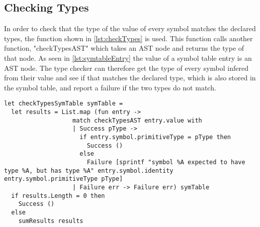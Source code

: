 \subsection{Checking Types}
In order to check that the type of the value of every symbol matches the declared types, the function shown in \cref{lst:checkTypes} is used. This function calls another function, "checkTypesAST" which takes an AST node and returns the type of that node. As seen in \cref{lst:symtableEntry} the value of a symbol table entry is an AST node. The type checker can therefore get the type of every symbol infered from their value and see if that matches the declared type, which is also stored in the symbol table, and report a failure if the two types do not match.

\begin{lstlisting}[style = fsharp, label = lst:checkTypes, caption = {The main function responsible for checking types.}]
let checkTypesSymTable symTable =
  let results = List.map (fun entry -> 
                   match checkTypesAST entry.value with
                   | Success pType ->
                     if entry.symbol.primitiveType = pType then
                       Success ()
                     else 
                       Failure [sprintf "symbol %A expected to have type %A, but has type %A" entry.symbol.identity entry.symbol.primitiveType pType]
                   | Failure err -> Failure err) symTable
  if results.Length = 0 then
    Success ()
  else
    sumResults results
\end{lstlisting}


